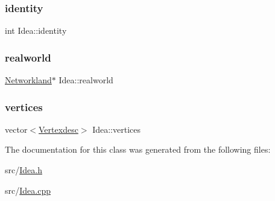 \subsubsection{\texorpdfstring{identity}{identity}}
{\footnotesize\ttfamily int Idea\+::identity\hspace{0.3cm}{\ttfamily [private]}}

\mbox{\label{classIdea_a0cfa1bec74431ad188ad974237244fe5}} 
\subsubsection{\texorpdfstring{realworld}{realworld}}
{\footnotesize\ttfamily \hyperlink{classNetworkland}{Networkland}$\ast$ Idea\+::realworld\hspace{0.3cm}{\ttfamily [private]}}

\mbox{\label{classIdea_a2d75d979d494040e3e8530d9aa0d860d}} 
\subsubsection{\texorpdfstring{vertices}{vertices}}
{\footnotesize\ttfamily vector$<$\hyperlink{Networkland_8h_af340ced64bd0b6914662d1b26be70b41}{Vertexdesc}$>$ Idea\+::vertices\hspace{0.3cm}{\ttfamily [private]}}



The documentation for this class was generated from the following files\+:\begin{DoxyCompactItemize}
\item 
src/\hyperlink{Idea_8h}{Idea.\+h}\item 
src/\hyperlink{Idea_8cpp}{Idea.\+cpp}\end{DoxyCompactItemize}
